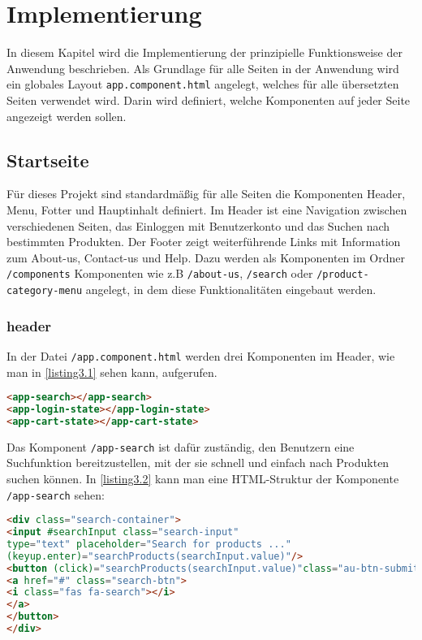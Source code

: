 \chapter{Implementierung}\label{Bausteine}

In diesem Kapitel wird die Implementierung der prinzipielle Funktionsweise der Anwendung beschrieben.
Als Grundlage für alle Seiten in der Anwendung wird ein globales Layout
\verb*|app.component.html| angelegt, welches für alle übersetzten Seiten verwendet wird. Darin wird definiert, welche Komponenten auf jeder Seite angezeigt werden sollen.


\section{Startseite}\label{startseite}

Für dieses Projekt sind standardmäßig für alle Seiten die Komponenten Header, Menu, Fotter und Hauptinhalt definiert. Im Header ist eine Navigation zwischen verschiedenen Seiten, das Einloggen mit Benutzerkonto und das Suchen nach bestimmten Produkten. Der Footer zeigt weiterführende Links mit Information zum About-us, Contact-us und Help. Dazu werden als Komponenten im Ordner \verb*|/components| Komponenten wie z.B \verb*|/about-us|, \verb*|/search| oder \verb*|/product-category-menu| angelegt, in dem diese Funktionalitäten eingebaut werden.

\subsection{header}

In der Datei \verb*|/app.component.html| werden drei Komponenten im Header, wie man in \ref{listing3.1} sehen kann, aufgerufen.

\begin{lstlisting}[language=HTML, label=listing3.1 , caption=Aufruf von Header-Komponenten]
<app-search></app-search>
<app-login-state></app-login-state>
<app-cart-state></app-cart-state>
\end{lstlisting}

Das Komponent \verb*|/app-search| ist dafür zuständig, den Benutzern eine Suchfunktion bereitzustellen, mit der sie schnell und einfach nach Produkten suchen können.
In \ref{listing3.2} kann man eine HTML-Struktur der Komponente \verb*|/app-search| sehen:
\newpage

\begin{lstlisting}[language=HTML, label=listing3.2, caption=HTML-Struktur der app-search-Komponente]
<div class="search-container">
<input #searchInput class="search-input"  
type="text" placeholder="Search for products ..."
(keyup.enter)="searchProducts(searchInput.value)"/>
<button (click)="searchProducts(searchInput.value)"class="au-btn-submit">
<a href="#" class="search-btn">
<i class="fas fa-search"></i>      
</a>
</button>
</div>
\end{lstlisting}

